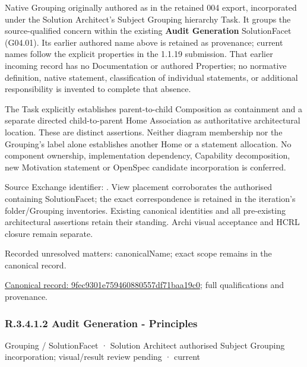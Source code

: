 Native Grouping originally authored as \texttt{} in the retained 004 export,
incorporated under the Solution Architect's Subject Grouping hierarchy Task.
It groups the source-qualified \texttt{} concern within
the existing \textbf{Audit Generation} SolutionFacet (G04.01). Its earlier authored name above is retained as provenance; current names
follow the explicit properties in the 1.1.19 submission.
That earlier incoming record has no Documentation or authored Properties; no normative
definition, native statement, classification of individual statements, or
additional responsibility is invented to complete that absence.



The Task explicitly establishes parent-to-child Composition as containment and
a separate directed child-to-parent Home Association as authoritative architectural
location. These are distinct assertions. Neither diagram membership nor the
Grouping's label alone establishes another Home or a statement allocation.
No component ownership, implementation dependency, Capability decomposition,
new Motivation statement or OpenSpec candidate incorporation is conferred.



Source Exchange identifier: \texttt{}. View placement corroborates
the authorised containing SolutionFacet; the exact correspondence is retained in the
iteration's folder/Grouping inventories. Existing canonical identities and all
pre-existing architectural assertions retain their standing. Archi visual
acceptance and HCRL closure remain separate.


{\small Recorded unresolved matters: canonicalName; exact scope remains in the canonical record.}\par
{\footnotesize \href{../../../../../../../continuum/grouping/9fec9301e759460880557df71baa19c0.md}{Canonical record: 9fec9301e759460880557df71baa19c0}; full qualifications and provenance.}\par
\subsubsection*{R.3.4.1.2 Audit Generation - Principles}
\label{navigation:R.3.4.1.2}

\label{element:d56a556f29ff4ba78634e58d103c786e}
{\small Grouping / SolutionFacet · Solution Architect authorised Subject Grouping incorporation; visual/result review pending · current}\par

